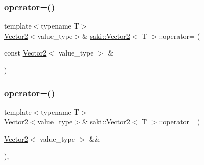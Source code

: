 \mbox{\label{classsaki_1_1_vector2_aaddfbeb26d405cf30e5bd31d6d4ebb62}} 
\subsubsection{\texorpdfstring{operator=()}{operator=()}\hspace{0.1cm}{\footnotesize\ttfamily [1/2]}}
{\footnotesize\ttfamily template$<$typename T$>$ \\
\mbox{\hyperlink{classsaki_1_1_vector2}{Vector2}}$<$value\+\_\+type$>$\& \mbox{\hyperlink{classsaki_1_1_vector2}{saki\+::\+Vector2}}$<$ T $>$\+::operator= (\begin{DoxyParamCaption}\item[{const \mbox{\hyperlink{classsaki_1_1_vector2}{Vector2}}$<$ value\+\_\+type $>$ \&}]{ }\end{DoxyParamCaption})\hspace{0.3cm}{\ttfamily [default]}}

\mbox{\label{classsaki_1_1_vector2_a1091cb5b6abb91b5d96aabeb706c351d}} 
\subsubsection{\texorpdfstring{operator=()}{operator=()}\hspace{0.1cm}{\footnotesize\ttfamily [2/2]}}
{\footnotesize\ttfamily template$<$typename T$>$ \\
\mbox{\hyperlink{classsaki_1_1_vector2}{Vector2}}$<$value\+\_\+type$>$\& \mbox{\hyperlink{classsaki_1_1_vector2}{saki\+::\+Vector2}}$<$ T $>$\+::operator= (\begin{DoxyParamCaption}\item[{\mbox{\hyperlink{classsaki_1_1_vector2}{Vector2}}$<$ value\+\_\+type $>$ \&\&}]{ }\end{DoxyParamCaption})\hspace{0.3cm}{\ttfamily [default]}, {\ttfamily [noexcept]}}

\mbox{\label{classsaki_1_1_vector2_a3578649a1c5b97df8bfb0b1932c24b8a}} 

